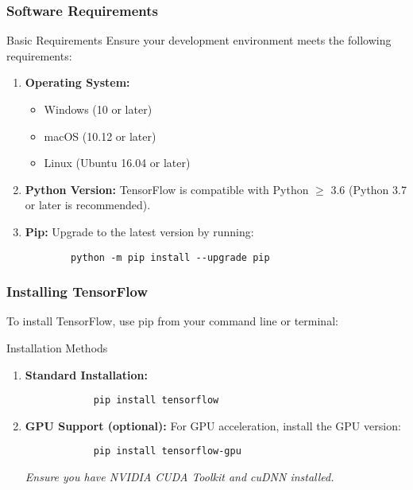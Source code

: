 \documentclass[aspectratio=169]{beamer}
\begin{document}
\begin{frame}[fragile]
    \frametitle{Software Requirements}
    \begin{block}{Basic Requirements}
        Ensure your development environment meets the following requirements:
    \end{block}
    \begin{enumerate}
        \item \textbf{Operating System:}
        \begin{itemize}
            \item Windows (10 or later)
            \item macOS (10.12 or later)
            \item Linux (Ubuntu 16.04 or later)
        \end{itemize}
        
        \item \textbf{Python Version:} 
        TensorFlow is compatible with Python $\geq$ 3.6 (Python 3.7 or later is recommended).

        \item \textbf{Pip:} 
        Upgrade to the latest version by running:
        \begin{lstlisting}
        python -m pip install --upgrade pip
        \end{lstlisting}
    \end{enumerate}
\end{frame}

\begin{frame}[fragile]
    \frametitle{Installing TensorFlow}
    To install TensorFlow, use pip from your command line or terminal:

    \begin{block}{Installation Methods}
        \begin{enumerate}
            \item \textbf{Standard Installation:}
            \begin{lstlisting}
            pip install tensorflow
            \end{lstlisting}
            
            \item \textbf{GPU Support (optional):} 
            For GPU acceleration, install the GPU version:
            \begin{lstlisting}
            pip install tensorflow-gpu
            \end{lstlisting}
            \textit{Ensure you have NVIDIA CUDA Toolkit and cuDNN installed.}
        \end{enumerate}
    \end{block}
\end{frame}
\end{document}
